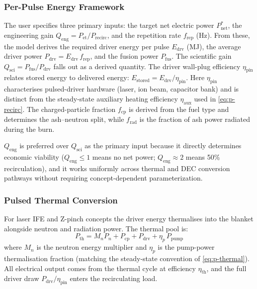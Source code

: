 \documentclass{article}
\begin{document}
\subsubsection{Per-Pulse Energy Framework}
The user specifies three primary inputs: the target net electric power
$P_{\text{net}}^*$, the engineering gain $Q_{\text{eng}} = P_{\text{et}}
/ P_{\text{recirc}}$, and the repetition rate $f_{\text{rep}}$ (Hz).
From these, the model derives the required driver energy per pulse
$E_{\text{drv}}$ (MJ), the average driver power
$P_{\text{drv}} = E_{\text{drv}} \, f_{\text{rep}}$, and the fusion
power $P_{\text{fus}}$.  The scientific gain
$Q_{\text{sci}} = P_{\text{fus}} / P_{\text{drv}}$ falls out as a
derived quantity.  The driver wall-plug efficiency $\eta_{\text{pin}}$
relates stored energy to delivered energy:
$E_{\text{stored}} = E_{\text{drv}} / \eta_{\text{pin}}$.
Here $\eta_{\text{pin}}$ characterises pulsed-driver hardware (laser, ion
beam, capacitor bank) and is distinct from the steady-state auxiliary
heating efficiency $\eta_{\text{aux}}$ used in \cref{eq:p-recirc}.
The charged-particle fraction $f_{\text{cp}}$ is derived from the fuel
type and determines the ash--neutron split, while
$f_{\text{rad}}$ is the fraction of ash power radiated during the burn.

$Q_{\text{eng}}$ is preferred over $Q_{\text{sci}}$ as the primary input
because it directly determines economic viability ($Q_{\text{eng}} \le 1$
means no net power; $Q_{\text{eng}} \approx 2$ means 50\% recirculation),
and it works uniformly across thermal and DEC conversion pathways without
requiring concept-dependent parameterization.

\subsubsection{Pulsed Thermal Conversion}
For laser IFE and Z-pinch concepts the driver energy thermalises into
the blanket alongside neutron and radiation power.  The thermal pool
is:
\begin{equation}
P_{\text{th}} = M_n P_n + P_{\text{cp}} + P_{\text{drv}} + \eta_p \, P_{\text{pump}}
\end{equation}
where $M_n$ is the neutron energy multiplier and $\eta_p$ is the
pump-power thermalisation fraction (matching the steady-state
convention of \cref{eq:p-thermal}).  All electrical output
comes from the thermal cycle at efficiency $\eta_{\text{th}}$, and
the full driver draw $P_{\text{drv}}/\eta_{\text{pin}}$ enters the
recirculating load.
\end{document}
